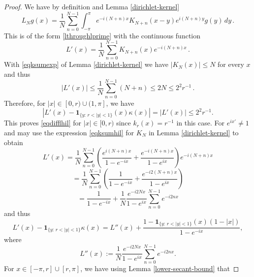 {\begin{proof}
We have by definition and Lemma \ref{dirichlet-kernel}
\begin{equation}
    L_Ng(x)=
    \frac 1N\sum_{n=0}^{N-1}
       \int_{-\pi}^{\pi} e^{-i(N+n)x} K_{N+n}(x-y) e^{i(N+n)y}g(y)
\, dy \, .\end{equation}
This is of the form \eqref{lthroughlprime} with
the continuous function
\begin{equation}
    {L'}(x)=  \frac 1N\sum_{n=0}^{N-1}
      K_{N+n}(x) e^{-i(N+n)x}\, .
\end{equation}
With \eqref{eqksumexp} of Lemma \ref{dirichlet-kernel}
we have $|K_N(x)|\le N$ for every $x$ and thus
\begin{equation}\label{eqhil13}
    |{L'}(x)|\le  \frac 1N\sum_{n=0}^{N-1}
      (N+n) \le 2N\le 2^2 r^{-1}\, .
\end{equation}
Therefore, for $|x|\in [0, r)\cup (1, \pi]$, we have
\begin{equation}
    \label{eqdiffzero}
    \left|L'(x)-\mathbf{1}_{\{y:\, r<|y|<1\}}(x)\kappa(x)\right|=|L'(x)|\leq 2^{2} r^{-1}.
\end{equation}
This proves \eqref{eqdifflhil} for $|x|\in [0, r)$ since $k_r(x)=r^{-1}$ in this case.
For $e^{ix'}\neq 1$
and may use the expression
\eqref{eqksumhil} for $K_N$
in Lemma \ref{dirichlet-kernel} to obtain
\begin{equation*}
    {L'}(x)=  \frac 1N\sum_{n=0}^{N-1}
     \left(\frac{e^{i(N+n)x}}{1-e^{-ix}}
      +\frac {e^{-i(N+n)x}}{1-e^{ix}}\right) e^{-i(N+n)x}
\end{equation*}
\begin{equation*}
    =  \frac 1N\sum_{n=0}^{N-1}
    \left(\frac{1}{1-e^{-ix}}
      +\frac {e^{-i2(N+n)x}}{1-e^{ix}}\right)
\end{equation*}
\begin{equation}\label{eqhil3}
    =  \frac{1}{1-e^{-ix}} +
     \frac 1N \frac {e^{-i2Nx}}{1-e^{ix}}
     \sum_{n=0}^{N-1}
    {e^{-i2nx}}
\end{equation}
and thus
\begin{equation}
\label{eq-L'L''}
  {L'}(x)  -\mathbf{1}_{\{y:\, r<|y|<1\}}\kappa(x)=L''(x)+ \frac{1-\mathbf{1}_{{\{y:\, r<|y|<1\}}}(x)(1-|x|)}{1-e^{-ix}},
\end{equation}
where
$$L''(x):=\frac 1N \frac {e^{-i2Nx}}{1-e^{ix}}
     \sum_{n=0}^{N-1}
    {e^{-i2nx}}.$$
For $x\in [-\pi, r]\cup [r, \pi]$, we have using Lemma \ref{lower-secant-bound} that

\end{proof}}
